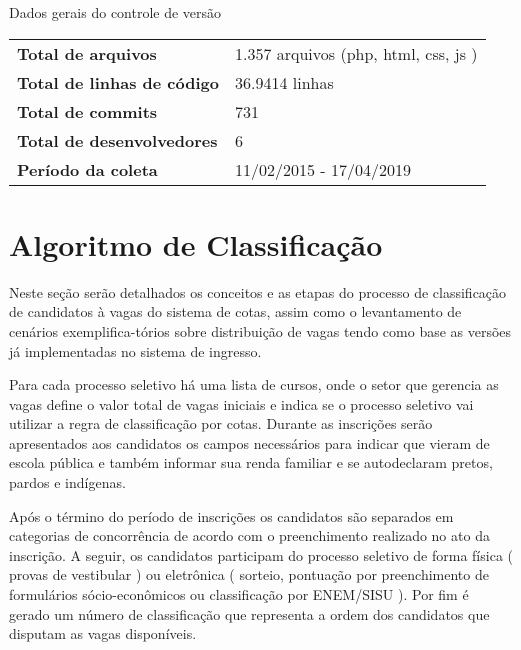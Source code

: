 \begin{quadro}
\caption{Dados gerais do controle de versão}
\label{quadro_git_ingresso}
\centering
\begin{tabular}{ l l }
   \cline{1-1}\cline{2-2}  
    \multicolumn{1}{|p{5.850cm}|}{\textbf{Total de arquivos}} &
    \multicolumn{1}{p{8.217cm}|}{1.357 arquivos (php, html, css, js )}
  \\ 
   \cline{1-1}\cline{2-2}  
    \multicolumn{1}{|p{5.850cm}|}{\textbf{Total de linhas de código}} &
    \multicolumn{1}{p{8.217cm}|}{36.9414 linhas}
  \\    
   \cline{1-1}\cline{2-2}  
    \multicolumn{1}{|p{5.850cm}|}{\textbf{Total de commits}} &
    \multicolumn{1}{p{8.217cm}|}{731}
  \\    
   \cline{1-1}\cline{2-2}  
    \multicolumn{1}{|p{5.850cm}|}{\textbf{Total de desenvolvedores}} &
    \multicolumn{1}{p{8.217cm}|}{6}
  \\     
   \cline{1-1}\cline{2-2}  
    \multicolumn{1}{|p{5.850cm}|}{\textbf{Período da coleta}} &
    \multicolumn{1}{p{8.217cm}|}{11/02/2015 - 17/04/2019}
  \\       
  \hline

 \end{tabular} 
\end{quadro}

\section{Algoritmo de Classificação}
\label{algoritimodeclassificacao}

Neste seção serão detalhados os conceitos e as etapas do processo de classificação de candidatos à vagas do sistema de cotas, assim como o levantamento de cenários exemplifica-tórios sobre distribuição de vagas tendo como base as versões já implementadas no sistema de ingresso.

Para cada processo seletivo há uma lista de cursos, onde o setor que gerencia as vagas define o valor total de vagas iniciais e indica se o processo seletivo vai utilizar a regra de classificação por cotas. Durante as inscrições serão apresentados aos candidatos os campos necessários para indicar que vieram de escola pública e também informar sua renda familiar e se autodeclaram pretos, pardos e indígenas.

Após o término do período de inscrições os candidatos são separados em categorias de concorrência de acordo com o preenchimento realizado no ato da inscrição. A seguir, os candidatos participam do processo seletivo de forma física ( provas de vestibular ) ou eletrônica ( sorteio, pontuação por preenchimento de formulários sócio-econômicos ou classificação por ENEM/SISU ). Por fim é gerado um número de classificação que representa a ordem dos candidatos que disputam as vagas disponíveis.


